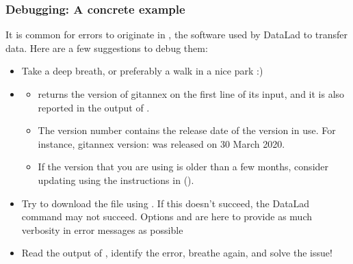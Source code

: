 \subsubsection{Debugging: A concrete example}
\label{\detokenize{basics/101-135-help:debugging-a-concrete-example}}
\sphinxAtStartPar
It is common for  errors to originate in {\hyperref[\detokenize{glossary:term-git-annex}]{}}, the software used by DataLad to transfer data. Here are a few suggestions to debug them:
\begin{itemize}
\item {} 
\sphinxAtStartPar
Take a deep breath, or preferably a walk in a nice park :)

\item {} \begin{description}
\begin{itemize}
\item {} 
\sphinxAtStartPar
{} returns the version of git\sphinxhyphen{}annex on the first line of its input, and it is also reported in the output of .

\item {} 
\sphinxAtStartPar
The version number contains the release date of the version in use. For instance, git\sphinxhyphen{}annex version:  was released on 30 March 2020.

\item {} 
\sphinxAtStartPar
If the version that you are using is older than a few months, consider updating using the instructions in {\hyperref[\detokenize{intro/installation:install}]{}} ().

\end{itemize}

\end{description}

\item {} 
\sphinxAtStartPar
Try to download the file using . If this doesn’t succeed, the DataLad command may not succeed. Options  and  are here to provide as much verbosity in error messages as possible

\item {} 
\sphinxAtStartPar
Read the output of {\hyperref[\detokenize{glossary:term-git-annex}]{}}, identify the error, breathe again, and solve the issue!

\end{itemize}


